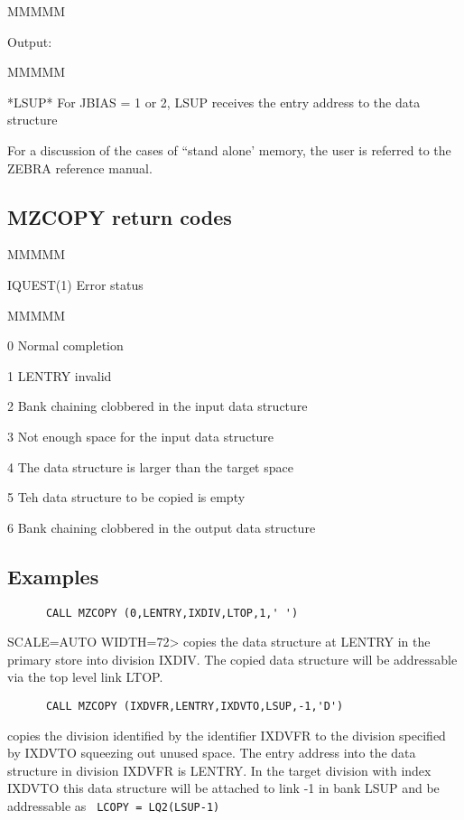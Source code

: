 \begin{DL}{MMMMM}
\item[Output:
]
\begin{DL}{MMMMM}
\item[*LSUP*
]For JBIAS = 1 or 2, LSUP receives
the entry address to the data structure
\end{DL}
\end{DL}
\par For a discussion of the cases of ``stand alone' memory, the user is
referred to the ZEBRA reference manual.
\subsection{MZCOPY return codes}
\begin{DL}{MMMMM}
\item[IQUEST(1)
]Error status
\begin{DL}{MMMMM}
\item[ 0
]Normal completion
\item[ 1
]LENTRY invalid
\item[ 2
]Bank chaining clobbered in the input data structure
\item[ 3
]Not enough space for the input data structure
\item[ 4
]The data structure is larger than the target space
\item[ 5
]Teh data structure to be copied is empty
\item[ 6
]Bank chaining clobbered in the output data structure
\end{DL}
\end{DL}
\subsection{Examples}
\begin{verbatim}
      CALL MZCOPY (0,LENTRY,IXDIV,LTOP,1,' ')
\end{verbatim}SCALE=AUTO WIDTH=72>
copies the data structure at LENTRY in the primary store into division
IXDIV. The copied data structure will be addressable via the
top level link LTOP.
\begin{verbatim}
      CALL MZCOPY (IXDVFR,LENTRY,IXDVTO,LSUP,-1,'D')
\end{verbatim}
copies the division identified by the identifier IXDVFR to the division
specified by IXDVTO squeezing out unused space.
The entry address into the
data structure in division IXDVFR is LENTRY. In the target division
with index IXDVTO this data structure will be attached to link -1
in bank LSUP and be addressable as {\tt
LCOPY = LQ2(LSUP-1)}

